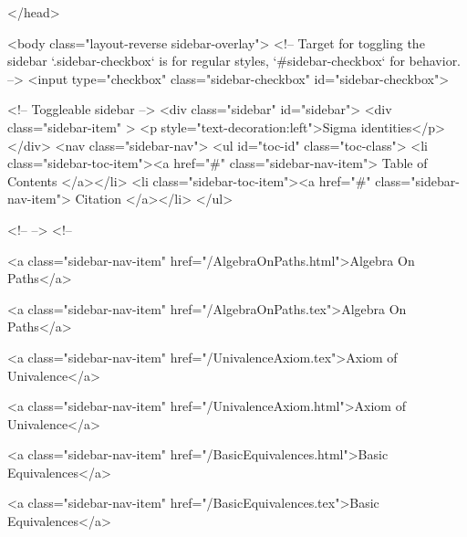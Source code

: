   
</head>




  <body class="layout-reverse sidebar-overlay">
    <!-- Target for toggling the sidebar `.sidebar-checkbox` is for regular
     styles, `#sidebar-checkbox` for behavior. -->
<input type="checkbox" class="sidebar-checkbox" id="sidebar-checkbox">

<!-- Toggleable sidebar -->
<div class="sidebar" id="sidebar">
  <div class="sidebar-item" >
    <p style="text-decoration:left">Sigma identities</p>
  </div>
  <nav class="sidebar-nav">
    <ul id="toc-id" class="toc-class">
  <li class="sidebar-toc-item"><a href="#" class="sidebar-nav-item"> Table of Contents </a></li>
  <li class="sidebar-toc-item"><a href="#" class="sidebar-nav-item"> Citation </a></li>
</ul>


    <!--  -->
    <!-- 
      
    
      
    
      
    
      
    
      
        
      
    
      
        
          <a class="sidebar-nav-item" href="/AlgebraOnPaths.html">Algebra On Paths</a>
        
      
    
      
        
          <a class="sidebar-nav-item" href="/AlgebraOnPaths.tex">Algebra On Paths</a>
        
      
    
      
        
          <a class="sidebar-nav-item" href="/UnivalenceAxiom.tex">Axiom of Univalence</a>
        
      
    
      
        
          <a class="sidebar-nav-item" href="/UnivalenceAxiom.html">Axiom of Univalence</a>
        
      
    
      
        
          <a class="sidebar-nav-item" href="/BasicEquivalences.html">Basic Equivalences</a>
        
      
    
      
        
          <a class="sidebar-nav-item" href="/BasicEquivalences.tex">Basic Equivalences</a>
        
